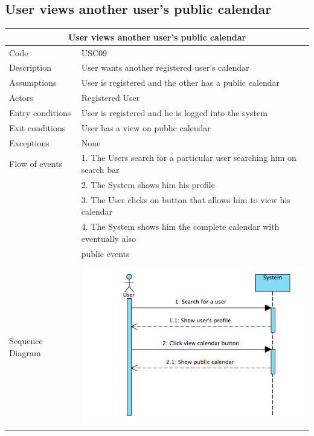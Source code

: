 \documentclass[12pt]{book}
\begin{document}
\subsection{User views another user's public calendar}
\vspace*{\fill}
\begin{center}
\begin{tabular}{ |l|l| }
  		\hline
  		\hline
  		\multicolumn{2}{|c|}{\large{\textbf{User views another user's public calendar}}} \\
  		\hline
  		\hline
  		Code  & USC09\\ 
		\hline
		Description & User wants another registered user's calendar\\
		\hline
		Assumptions & User is registered and the other has a public calendar\\
		\hline
		Actors & Registered User\\
		\hline
		Entry conditions & User is registered and he is logged into the system\\
		\hline
		Exit conditions & User has a view on public calendar \\
		\hline
		Exceptions & None  \\
		\hline
		Flow of events &  
			1. The Users search for a particular user searching him on search bar\\&			
			2. The System shows him his profile\\&
			3. The User clicks on button that allows him to view his calendar \\&
			4. The System shows him the complete calendar with eventually also \\ & public events\\
  		\hline 
		&\\
		Sequence Diagram & \includegraphics[scale=0.6]{viewUserSD}\\
		\hline
  		\hline
\end{tabular} \\
\end{center}
\vspace*{\fill}
\end{document}
